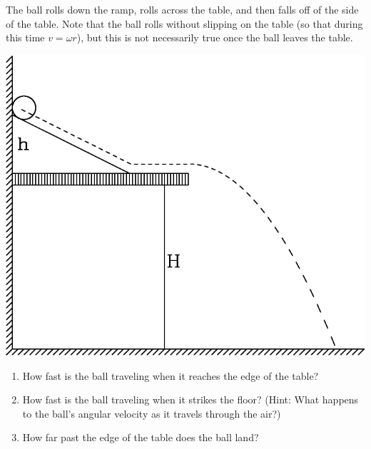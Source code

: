 \documentclass[12pt]{article}
\begin{document}
\begin{enumerate}
\begin{minipage}{0.5\textwidth}
	The ball rolls down the ramp, rolls across the table, and then falls off of the side of the table. Note that the ball rolls without slipping on the table (so that during this time $v = \omega r$), but this is not necessarily true once the ball leaves the table.
\end{minipage}
\hspace{0.05\textwidth}
\begin{minipage}{0.4\textwidth}
\centerline{\includegraphics[width=\textwidth]{3-crop.pdf}}
\end{minipage}
\bigskip

\begin{enumerate}
	\item  How fast is the ball traveling when it reaches the edge of the table?
	\item How fast is the ball traveling when it strikes the floor? (Hint: What happens to the ball's angular velocity as it travels through the air?)
	\item How far past the edge of the table does the ball land? 
\end{enumerate}




\end{enumerate}
\end{document}
